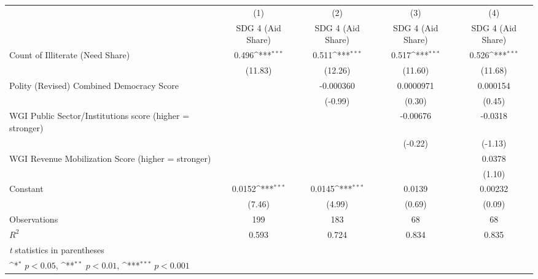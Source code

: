 {
\def\sym#1{\ifmmode^{#1}\else\(^{#1}\)\fi}
\begin{tabular}{l*{4}{c}}
\hline\hline
                &\multicolumn{1}{c}{(1)}&\multicolumn{1}{c}{(2)}&\multicolumn{1}{c}{(3)}&\multicolumn{1}{c}{(4)}\\
                &\multicolumn{1}{c}{SDG 4 (Aid Share)}&\multicolumn{1}{c}{SDG 4 (Aid Share)}&\multicolumn{1}{c}{SDG 4 (Aid Share)}&\multicolumn{1}{c}{SDG 4 (Aid Share)}\\
\hline
Count of Illiterate (Need Share)&    0.496\sym{***}&    0.511\sym{***}&    0.517\sym{***}&    0.526\sym{***}\\
                &  (11.83)         &  (12.26)         &  (11.60)         &  (11.68)         \\
[1em]
Polity (Revised) Combined Democracy Score&                  &-0.000360         &0.0000971         & 0.000154         \\
                &                  &  (-0.99)         &   (0.30)         &   (0.45)         \\
[1em]
WGI Public Sector/Institutions score (higher = stronger)&                  &                  & -0.00676         &  -0.0318         \\
                &                  &                  &  (-0.22)         &  (-1.13)         \\
[1em]
WGI Revenue Mobilization Score (higher = stronger)&                  &                  &                  &   0.0378         \\
                &                  &                  &                  &   (1.10)         \\
[1em]
Constant        &   0.0152\sym{***}&   0.0145\sym{***}&   0.0139         &  0.00232         \\
                &   (7.46)         &   (4.99)         &   (0.69)         &   (0.09)         \\
\hline
Observations    &      199         &      183         &       68         &       68         \\
\(R^{2}\)       &    0.593         &    0.724         &    0.834         &    0.835         \\
\hline\hline
\multicolumn{5}{l}{\footnotesize \textit{t} statistics in parentheses}\\
\multicolumn{5}{l}{\footnotesize \sym{*} \(p<0.05\), \sym{**} \(p<0.01\), \sym{***} \(p<0.001\)}\\
\end{tabular}
}
